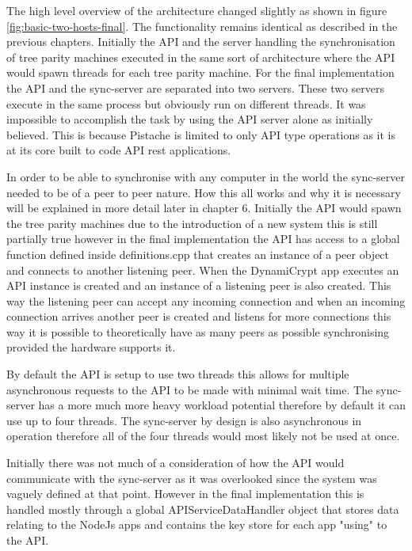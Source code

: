 The high level overview of the architecture changed slightly as shown in figure \ref{fig:basic-two-hosts-final}. The functionality remains identical as described in the previous chapters. Initially the API and the server handling the synchronisation of tree parity machines executed in the same sort of architecture where the API would spawn threads for each tree parity machine. For the final implementation the API and the sync-server are separated into two servers. These two servers execute in the same process but obviously run on different threads. It was impossible to accomplish the task by using the API server alone as initially believed. This is because Pistache is limited to only API type operations as it is at its core built to code API rest applications. 

In order to be able to synchronise with any computer in the world the sync-server needed to be of a peer to peer nature. How this all works and why it is necessary will be explained in more detail later in chapter 6. Initially the API would spawn the tree parity machines due to the introduction of a new system this is still partially true however in the final implementation the API has access to a global function defined inside definitions.cpp that creates an instance of a peer object and connects to another listening peer. When the DynamiCrypt app executes an API instance is created and an instance of a listening peer is also created. This way the listening peer can accept any incoming connection and when an incoming connection arrives another peer is created and listens for more connections this way it is possible to theoretically have as many peers as possible synchronising provided the hardware supports it. 

By default the API is setup to use two threads this allows for multiple asynchronous requests to the API to be made with minimal wait time. The sync-server has a more much more heavy workload potential therefore by default it can use up to four threads. The sync-server by design is also asynchronous in operation therefore all of the four threads would most likely not be used at once. 

Initially there was not much of a consideration of how the API would communicate with the sync-server as it was overlooked since the system was vaguely defined at that point. However in the final implementation this is handled mostly through a global APIServiceDataHandler object that stores data relating to the NodeJs apps and contains the key store for each app "using" to the API.


